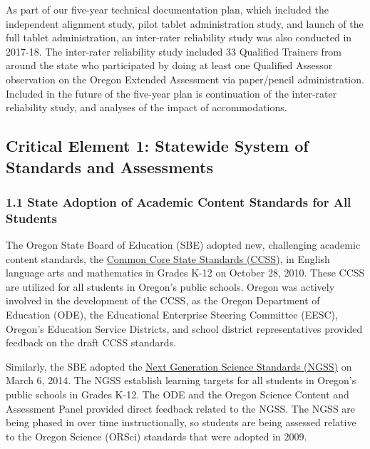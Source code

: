 \documentclass[]{article}
\begin{document}
As part of our five-year technical documentation plan, which included
the independent alignment study, pilot tablet administration study, and
launch of the full tablet administration, an inter-rater reliability
study was also conducted in 2017-18. The inter-rater reliability study
included 33 Qualified Trainers from around the state who participated by
doing at least one Qualified Assessor observation on the Oregon Extended
Assessment via paper/pencil administration. Included in the future of
the five-year plan is continuation of the inter-rater reliability study,
and analyses of the impact of accommodations.

\subsection{Critical Element 1: Statewide System of Standards and
Assessments}\label{critical-element-1-statewide-system-of-standards-and-assessments}

\subsubsection{1.1 State Adoption of Academic Content Standards for All
Students}\label{state-adoption-of-academic-content-standards-for-all-students}

The Oregon State Board of Education (SBE) adopted new, challenging
academic content standards, the
\color{link}\href{https://www.oregon.gov/ode/educator-resources/standards/Pages/default.aspx}{Common
Core State Standards (CCSS)}\color{black}, in English language arts and
mathematics in Grades K-12 on October 28, 2010. These CCSS are utilized
for all students in Oregon's public schools. Oregon was actively
involved in the development of the CCSS, as the Oregon Department of
Education (ODE), the Educational Enterprise Steering Committee (EESC),
Oregon's Education Service Districts, and school district
representatives provided feedback on the draft CCSS standards.

Similarly, the SBE adopted the
\color{link}\href{https://www.oregon.gov/ode/educator-resources/standards/science/Pages/Science-Standards.aspx}{Next
Generation Science Standards (NGSS)} \color{black} on March 6, 2014. The
NGSS establish learning targets for all students in Oregon's public
schools in Grades K-12. The ODE and the Oregon Science Content and
Assessment Panel provided direct feedback related to the NGSS. The NGSS
are being phased in over time instructionally, so students are being
assessed relative to the Oregon Science (ORSci) standards that were
adopted in 2009.
\end{document}
